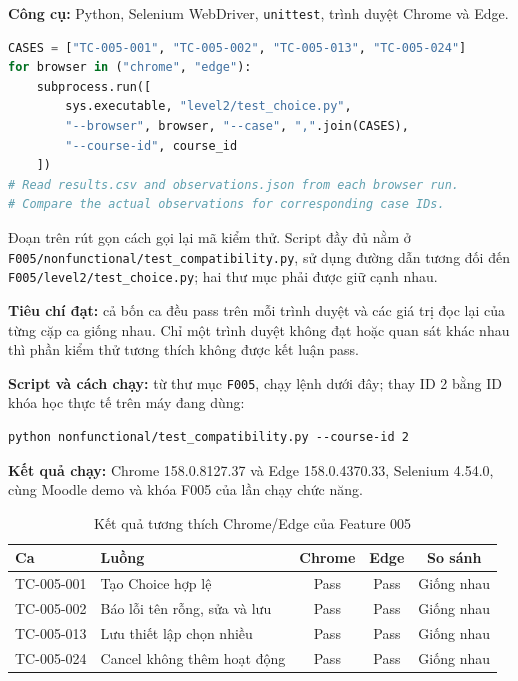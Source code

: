 \documentclass[12pt,a4paper]{article}
\begin{document}
\textbf{Công cụ:} Python, Selenium WebDriver, \texttt{unittest}, trình duyệt Chrome và Edge.

\begin{lstlisting}[language=Python]
CASES = ["TC-005-001", "TC-005-002", "TC-005-013", "TC-005-024"]
for browser in ("chrome", "edge"):
    subprocess.run([
        sys.executable, "level2/test_choice.py",
        "--browser", browser, "--case", ",".join(CASES),
        "--course-id", course_id
    ])
# Read results.csv and observations.json from each browser run.
# Compare the actual observations for corresponding case IDs.
\end{lstlisting}
Đoạn trên rút gọn cách gọi lại mã kiểm thử. Script đầy đủ nằm ở
\texttt{F005/nonfunctional/test\_compatibility.py}, sử dụng đường dẫn tương đối đến
\texttt{F005/level2/test\_choice.py}; hai thư mục phải được giữ cạnh nhau.

\textbf{Tiêu chí đạt:} cả bốn ca đều pass trên mỗi trình duyệt và các giá trị đọc lại của từng cặp ca
giống nhau. Chỉ một trình duyệt không đạt hoặc quan sát khác nhau thì phần kiểm thử tương thích
không được kết luận pass.

\textbf{Script và cách chạy:} từ thư mục \texttt{F005}, chạy lệnh dưới đây; thay ID 2 bằng ID khóa học
thực tế trên máy đang dùng:
\begin{lstlisting}
python nonfunctional/test_compatibility.py --course-id 2
\end{lstlisting}

\textbf{Kết quả chạy:} Chrome 158.0.8127.37 và Edge 158.0.4370.33,
Selenium 4.54.0, cùng Moodle demo và khóa F005 của lần chạy chức năng.

\begin{table}[H]
\centering\small
\begin{tabular}{|L{2.6cm}|L{5.0cm}|c|c|c|}
\hline
{}\textbf{Ca} & \textbf{Luồng} & \textbf{Chrome} & \textbf{Edge} & \textbf{So sánh} \\ \hline
TC-005-001 & Tạo Choice hợp lệ & Pass & Pass & Giống nhau \\ \hline
TC-005-002 & Báo lỗi tên rỗng, sửa và lưu & Pass & Pass & Giống nhau \\ \hline
TC-005-013 & Lưu thiết lập chọn nhiều & Pass & Pass & Giống nhau \\ \hline
TC-005-024 & Cancel không thêm hoạt động & Pass & Pass & Giống nhau \\ \hline
\end{tabular}
\caption{Kết quả tương thích Chrome/Edge của Feature 005}
\end{table}
\end{document}
